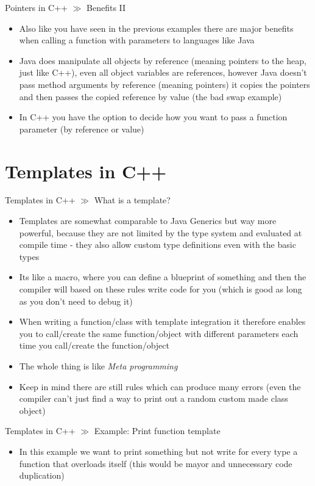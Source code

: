 \documentclass[10pt]{beamer}
\begin{document}
\begin{frame}{Pointers in C++ $\gg$ Benefits II}
\begin{itemize}
	\item Also like you have seen in the previous examples there are major benefits when calling a function with parameters to languages like Java
	\item Java does manipulate all objects by reference (meaning pointers to the heap, just like C++), even all object variables are references, however Java doesn't pass method arguments by reference (meaning pointers) it copies the pointers and then passes the copied reference by value (the bad swap example)
	\item In C++ you have the option to decide how you want to pass a function parameter (by reference or value)
\end{itemize}
\end{frame}

\section{Templates in C++}

\begin{frame}{Templates in C++ $\gg$ What is a template?}
\begin{itemize}
	\item Templates are somewhat comparable to Java Generics but way more powerful, because they are not limited by the type system and evaluated at compile time - they also allow custom type definitions even with the basic types
	\item Its like a macro, where you can define a blueprint of something and then the compiler will based on these rules write code for you (which is good as long as you don't need to debug it)
	\item When writing a function/class with template integration it therefore enables you to call/create the same function/object with different parameters each time you call/create the function/object
	\item The whole thing is like \textit{Meta programming}
	\item Keep in mind there are still rules which can produce many errors (even the compiler can't just find a way to print out a random custom made class object)
\end{itemize}
\end{frame}

\begin{frame}{Templates in C++ $\gg$ Example: Print function template}
\begin{itemize}
	\item In this example we want to print something but not write for every type a function that overloads itself (this would be mayor and unnecessary code duplication)
	\inputminted[bgcolor=lightGreyCustom,fontsize=\scriptsize ]{cpp}{./resources/templates/print_function_template_example.cpp}
\end{itemize}
\end{frame}
\end{document}
